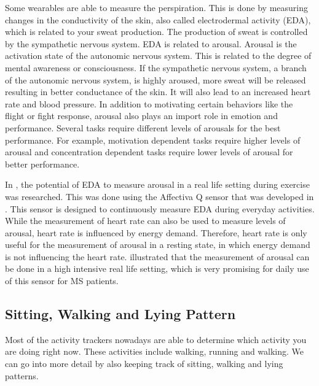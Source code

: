 Some wearables are able to measure the perspiration. 
This is done by measuring  changes in the conductivity of the skin, also called electrodermal activity (EDA), which is related to your sweat production.
The production of sweat is controlled by the sympathetic nervous system.
EDA is related to arousal.
Arousal is the activation state of the autonomic nervous system. 
This is related to the degree of mental awareness or consciousness. 
If the sympathetic nervous system, a branch of the autonomic nervous system, is highly aroused, more sweat will be released resulting in better conductance of the skin.
It will also lead to an increased heart rate and blood pressure.
In addition to motivating certain behaviors like the flight or fight response, arousal also plays an import role in emotion and performance.
Several tasks require different levels of arousals for the best performance.
For example, motivation dependent tasks require higher levels of arousal and concentration dependent tasks require lower levels of arousal for better performance.

In \cite{knufinke2012measurement}, the potential of EDA to measure arousal in a real life setting during exercise was researched. 
This was done using the Affectiva Q\textsuperscript{\texttrademark} sensor that was developed in \cite{poh2010wearable}. This sensor is designed to continuously measure EDA during everyday activities. 
While the measurement of heart rate can also be used to measure levels of arousal, heart rate is influenced by energy demand. Therefore, heart rate is only useful for the measurement of arousal in a resting state, in which energy demand is not influencing the heart rate.
\cite{knufinke2012measurement} illustrated that the measurement of arousal can be done in a high intensive real life setting, which is very promising for daily use of this sensor for MS patients.

\subsection{Sitting, Walking and Lying Pattern}
Most of the activity trackers nowadays are able to determine which activity you are doing right now. These activities include walking, running and walking.
We can go into more detail by also keeping track of sitting, walking and lying patterns.

